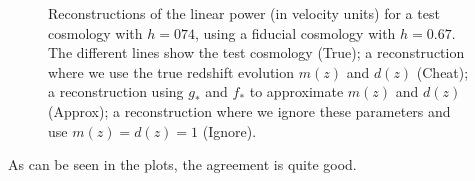 \begin{figure}[ht]
\begin{center}
 \end{center}
 \caption{Reconstructions of the linear power (in velocity units) for a test
  cosmology with $h=074$, using a fiducial cosmology with $h=0.67$.
  The different lines show the test cosmology (True); a reconstruction where
  we use the true redshift evolution $m(z)$ and $d(z)$ (Cheat); a
  reconstruction using $g_\ast$ and $f_\ast$ to approximate $m(z)$ and $d(z)$
  (Approx); a reconstruction where we ignore these parameters and use
  $m(z) = d(z) = 1$ (Ignore).}
 \label{fig:recP}
\end{figure}

As can be seen in the plots, the agreement is quite good.
